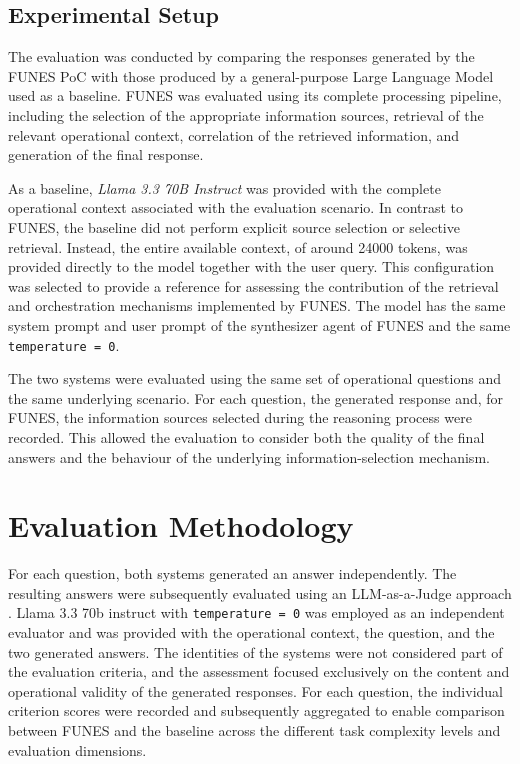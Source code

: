 \subsection{Experimental Setup}

The evaluation was conducted by comparing the responses generated by the FUNES PoC with those produced by a general-purpose Large Language Model used as a baseline. FUNES was evaluated using its complete processing pipeline, including the selection of the appropriate information sources, retrieval of the relevant operational context, correlation of the retrieved information, and generation of the final response.

As a baseline, \textit{Llama 3.3 70B Instruct} was provided with the complete operational context associated with the evaluation scenario. In contrast to FUNES, the baseline did not perform explicit source selection or selective retrieval. Instead, the entire available context, of around 24000 tokens, was provided directly to the model together with the user query. This configuration was selected to provide a reference for assessing the contribution of the retrieval and orchestration mechanisms implemented by FUNES. The model has the same system prompt and user prompt of the synthesizer agent of FUNES and the same  \texttt{temperature = 0}.

The two systems were evaluated using the same set of operational questions and the same underlying scenario. For each question, the generated response and, for FUNES, the information sources selected during the reasoning process were recorded. This allowed the evaluation to consider both the quality of the final answers and the behaviour of the underlying information-selection mechanism.



\section{Evaluation Methodology}
\label{sec:evaluation methodology}


For each question, both systems generated an answer independently. The resulting answers were subsequently evaluated using an LLM-as-a-Judge approach \cite{zheng2023judging}. Llama 3.3 70b instruct with \texttt{temperature = 0} was employed as an independent evaluator and was provided with the operational context, the question, and the two generated answers. The identities of the systems were not considered part of the evaluation criteria, and the assessment focused exclusively on the content and operational validity of the generated responses. For each question, the individual criterion scores were recorded and subsequently aggregated to enable comparison between FUNES and the baseline across the different task complexity levels and evaluation dimensions.

